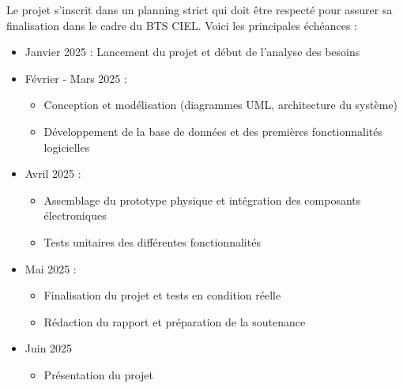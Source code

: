 \documentclass[main.tex]{subfiles}
\begin{document}
\quad Le projet s’inscrit dans un planning strict qui doit être respecté pour assurer sa finalisation dans le cadre du BTS CIEL. Voici les principales échéances :

\begin{itemize}

	\item Janvier 2025 : Lancement du projet et début de l’analyse des besoins
	\item Février - Mars 2025 :
	\begin{itemize}
		\item Conception et modélisation (diagrammes UML, architecture du système)
		\item Développement de la base de données et des premières fonctionnalités logicielles
	\end{itemize}
	\item Avril 2025 :
	\begin{itemize}
		\item Assemblage du prototype physique et intégration des composants électroniques
		\item Tests unitaires des différentes fonctionnalités
	\end{itemize}
	\item Mai 2025 :
	\begin{itemize}
		\item Finalisation du projet et tests en condition réelle
		\item Rédaction du rapport et préparation de la soutenance
	\end{itemize}
	\item Juin 2025 
	\begin{itemize}
		\item Présentation du projet
	\end{itemize}
	
\end{itemize}

\newpage
\end{document}
